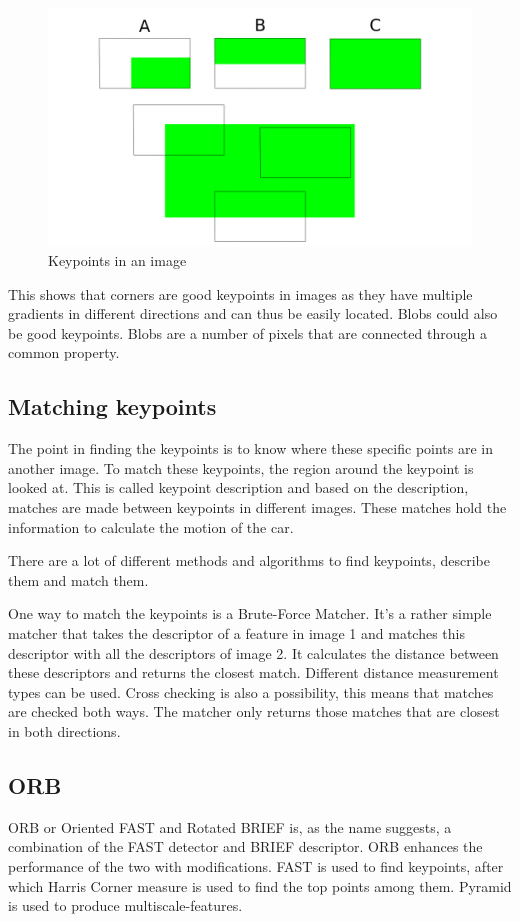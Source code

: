\begin{figure}
    \centering
    \includegraphics[width=1\textwidth]{figures/features.png}
    \caption{Keypoints in an image}
    \label{fig:features}
\end{figure}

This shows that corners are good keypoints in images as they have multiple gradients in different directions and can thus be easily located. Blobs could also be good keypoints. Blobs are a number of pixels that are connected through a common property.

\subsection{Matching keypoints}
The point in finding the keypoints is to know where these specific points are in another image. To match these keypoints, the region around the keypoint is looked at. This is called keypoint description and based on the description, matches are made between keypoints in different images. These matches hold the information to calculate the motion of the car.\bigskip

There are a lot of different methods and algorithms to find keypoints, describe them and match them.\bigskip

One way to match the keypoints is a Brute-Force Matcher. It's a rather simple matcher that takes the descriptor of a feature in image 1 and matches this descriptor with all the descriptors of image 2. It calculates the distance between these descriptors and returns the closest match. Different distance measurement types can be used. Cross checking is also a possibility, this means that matches are checked both ways. The matcher only returns those matches that are closest in both directions.

\subsection{ORB}
ORB or Oriented FAST and Rotated BRIEF is, as the name suggests, a combination of the FAST detector and BRIEF descriptor. ORB enhances the performance of the two with modifications. FAST is used to find keypoints, after which Harris Corner measure is used to find the top points among them. Pyramid is used to produce multiscale-features.